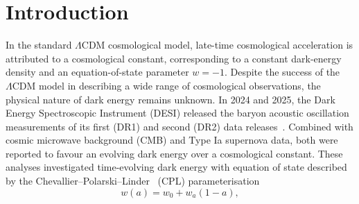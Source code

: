 \documentclass[aps,prd,reprint,preprintnumbers,showpacs,floatfix,nofootinbib,superscriptaddress]{revtex4-2}
\newcommand{\LCDM}{\ensuremath{\Lambda\mathrm{CDM}}}
\begin{document}
\maketitle

{
\setlength{\parskip}{0pt}
\setlength{\topsep}{0pt}
\setlength{\partopsep}{0pt}
\setlength{\itemsep}{0pt}
\renewcommand{\baselinestretch}{0.8}
\tableofcontents
}
\newpage


\section{Introduction}
\label{sec:intro}

In the standard \LCDM{} cosmological model, late-time cosmological acceleration is attributed to a cosmological constant, corresponding to a constant dark-energy density and an equation-of-state parameter $w=-1$. Despite the success of the \LCDM{} model in describing a wide range of cosmological observations, the physical nature of dark energy remains unknown. In 2024 and 2025, the Dark Energy Spectroscopic Instrument (DESI) released the baryon acoustic oscillation measurements of its first (DR1) and second (DR2) data releases~\citep{DESI:2024uvr,DESI:2024mwx,DESI:2025zgx,DESI:2025zpo}. Combined with cosmic microwave background (CMB) and Type Ia supernova data, both were reported to favour an evolving dark energy over a cosmological constant. These analyses investigated time-evolving dark energy with equation of state described by the Chevallier--Polarski--Linder~\citep{Chevallier:2000qy, Linder:2002et} (CPL) parameterisation
\begin{equation}
		    w(a)=w_0+w_a(1-a),
\end{equation}
\end{document}
